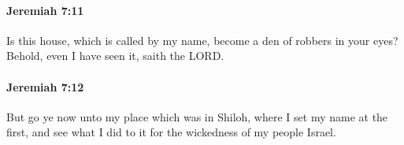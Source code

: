 		\paragraph{Jeremiah 7:11} %
			\label{JEREMIAH-7-11}

			Is this house, which is called by my name, become a den of robbers in your eyes? Behold, even I have seen it, saith the LORD.


		\paragraph{Jeremiah 7:12} %
			\label{JEREMIAH-7-12}

			But go ye now unto my place which was in Shiloh, where I set my name at the first, and see what I did to it for the wickedness of my people Israel.


